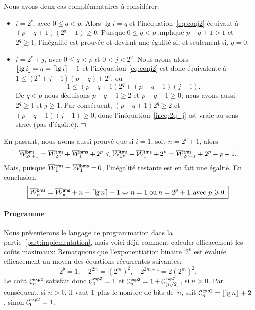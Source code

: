 Nous avons deux cas complémentaires à considérer:
\begin{itemize}

\item \(i = 2^q\), avec \(0 \leqslant q < p\). Alors \(\lg i = q\) et
  l'inéquation~\eqref{eq:conj2} équivaut à \((p-q+1)(2^q-1) \geqslant
  0\). Puisque \(0 \leqslant q < p\) implique \(p-q+1>1\) et \(2^q
  \geqslant 1\), l'inégalité est prouvée et devient une égalité si, et
  seulement si, \(q=0\).

  \item \(i = 2^q + j\), avec \(0 \leqslant q < p\) et \(0 < j <
    2^q\). Nous avons alors \(\floor{\lg i} = q = \ceiling{\lg i} -
    1\) et l'inéquation~\eqref{eq:conj2} est donc équivalente à \(1
    \leqslant (2^q + j - 1) (p-q) + 2^q\), ou
    \begin{equation}
     1 \leqslant (p-q+1)2^q + (p-q-1)(j-1).\label{ineq:2q_j}
    \end{equation}
    De \(q < p\) nous déduisons \(p-q+1 \geqslant 2\) et \(p-q-1
    \geqslant 0\); nous avons aussi \(2^q \geqslant 1\) et \(j
    \geqslant 1\). Par conséquent, \((p-q+1)2^q \geqslant 2\) et
    \((p-q-1)(j-1) \geqslant 0\), donc l'inéquation~\eqref{ineq:2q_j}
    est vraie au sens strict (pas d'égalité).\hfill\(\Box\)

\end{itemize}
En passant, nous avons aussi prouvé que si \(i=1\), soit \(n=2^p +
1\), alors
\begin{equation*}
\OW{\fun{bms}}{2^p+1} = \OW{\fun{tms}}{2^p} +
\OW{\fun{bms}}{1} + 2^p \leqslant \OW{\fun{tms}}{2^p} +
\OW{\fun{tms}}{1} + 2^p = \OW{\fun{tms}}{2^p+1} + 2^p - p - 1.
\end{equation*}
Mais, puisque \(\OW{\fun{tms}}{1} = \OW{\fun{bms}}{1} = 0\),
l'inégalité restante est en fait une égalité. En conclusion,
\begin{equation*}
\boxed{\OW{\fun{bms}}{n} = \OW{\fun{tms}}{n} + n - \ceiling{\lg n} - 1
  \Leftrightarrow n=1 \;\text{ou}\; n=2^p+1, \text{avec \(p \geqslant
    0\)}.}
\end{equation*}

\paragraph{Programme}

Nous présenterons le langage de programmation \Erlang dans la
partie~\ref{part:implementation}, mais voici déjà comment calculer
efficacement les coûts maximaux:  Remarquons
que l'exponentiation binaire~\(2^n\) est évaluée efficacement au moyen
des équations récurrentes suivantes:
\begin{equation*}
2^0 = 1,\quad 2^{2m} = (2^m)^2,\quad 2^{2m+1} =  2(2^m)^2.
\end{equation*}
Le coût \(\C{\fun{exp2}}{n}\) satisfait donc \(\C{\fun{exp2}}{0} = 1\)
et \(\C{\fun{exp2}}{n} = 1 + \C{\fun{exp2}}{\floor{n/2}}\), si \(n >
0\). Par conséquent, si \(n > 0\), il vaut \(1\)~plus le nombre de
bits de~\(n\), soit \(\C{\fun{exp2}}{n} = \floor{\lg n} + 2\), sinon
\(\C{\fun{exp2}}{0} = 1\).

